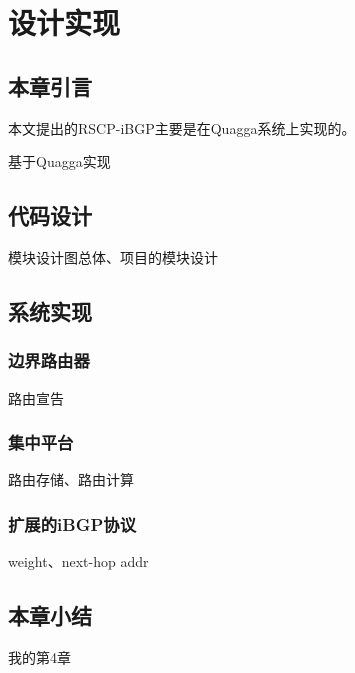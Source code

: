 \chapter{设计实现}
\label{cha:design}

\section{本章引言}
本文提出的RSCP-iBGP主要是在Quagga系统上实现的。

基于Quagga实现

\section{代码设计}
模块设计图总体、项目的模块设计


\section{系统实现}

\subsection{边界路由器}
路由宣告
\subsection{集中平台}
路由存储、路由计算
\subsection{扩展的iBGP协议}
weight、next-hop addr
\section{本章小结}
我的第4章
